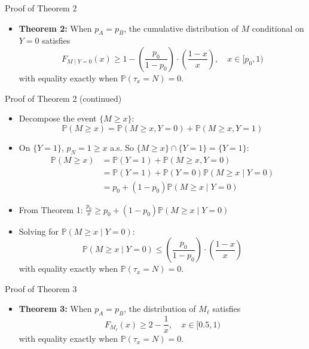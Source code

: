 \documentclass{beamer}
\renewcommand{\P}{\mathbb{P}}
\begin{document}
\begin{frame}{Proof of Theorem 2}
\begin{itemize}
  \item \textbf{Theorem 2:} When $p_A = p_B$, the cumulative distribution of $M$ conditional on $Y = 0$ satisfies
  \begin{equation*}
    F_{M \mid Y = 0}(x) \geq 1 - \left(\frac{p_0}{1-p_0}\right) \cdot \left(\frac{1 - x}{x}\right), \quad x \in [p_0, 1)
  \end{equation*}
  with equality exactly when $\P(\tau_x=N)=0$.
\end{itemize}
\end{frame}

\begin{frame}{Proof of Theorem 2 (continued)}
\begin{itemize}
  \item Decompose the event $\{M \geq x\}$:
  \begin{equation*}
    \P(M \geq x) = \P(M \geq x, Y = 0) + \P(M \geq x, Y = 1)
  \end{equation*}
  \item On $\{Y = 1\}$, $p_N = 1 \geq x$ a.s. So $\{M \geq x\} \cap \{Y = 1\} = \{Y = 1\}$:
  \begin{align*}
    \P(M \geq x) &= \P(Y = 1) + \P(M \geq x, Y = 0) \\
    &= \P(Y = 1) + \P(Y = 0)\P(M \geq x \mid Y = 0) \\
    &= p_0 + (1 - p_0)\P(M \geq x \mid Y = 0)
  \end{align*}
  \item From Theorem 1: $\frac{p_0}{x} \geq p_0 + (1 - p_0)\P(M \geq x \mid Y = 0)$
  \item Solving for $\P(M \geq x \mid Y = 0)$:
  \begin{equation*}
    \P(M \geq x \mid Y = 0) \leq \left(\frac{p_0}{1-p_0}\right) \cdot \left(\frac{1 - x}{x}\right)
  \end{equation*}
  with equality exactly when $\P(\tau_x=N)=0$.
\end{itemize}
\end{frame}

\begin{frame}{Proof of Theorem 3}
\begin{itemize}
  \item \textbf{Theorem 3:} When $p_A = p_B$, the distribution of $M_\ell$ satisfies
  \begin{equation*}
    F_{M_\ell}(x) \geq 2 - \frac{1}{x}, \quad x \in [0.5, 1)
  \end{equation*}
  with equality exactly when $\P(\tau_x = N) = 0$.
\end{itemize}
\end{frame}
\end{document}
